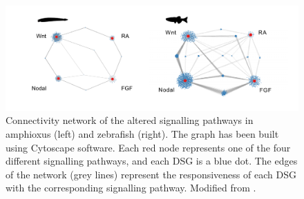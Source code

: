 \begin{figure}[h]
\centering
\includegraphics[width=1\textwidth]{Figures/Cytoscape_connectivity}
\caption[Cytoscape connectivity]{Connectivity network of the altered signalling pathways in amphioxus (left) and zebrafish (right). The graph has been built using Cytoscape software. Each red node represents one of the four different signalling pathways, and each DSG is a blue dot. The edges of the network (grey lines) represent the responsiveness of each DSG with the corresponding signalling pathway. Modified from \parencite{gil-galvez_gain_2022}.}
\label{fig:Cytoscape_connectivity}
\end{figure} 


